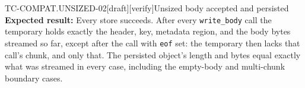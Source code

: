 \begin{requirement}{TC-COMPAT.UNSIZED-02}[draft][verify]{Unsized body accepted and persisted}
  \textbf{Expected result:} Every store succeeds. After every
  \texttt{write\_body} call the temporary holds exactly the header, key,
  metadata region, and the body bytes streamed so far, except after the
  call with \texttt{eof} set: the temporary then lacks that call's chunk,
  and only that. The persisted object's length and bytes equal exactly what
  was streamed in every case, including the empty-body and multi-chunk
  boundary cases.



\end{requirement}

